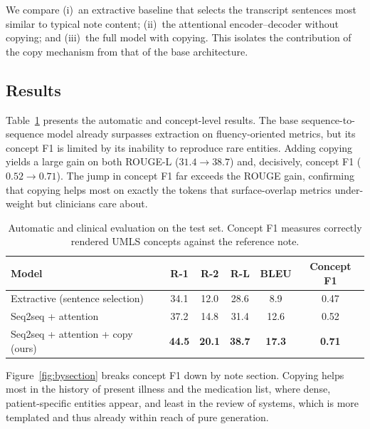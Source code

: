 \documentclass{article}
\begin{document}
We compare (i)~an extractive baseline that selects the transcript sentences most
similar to typical note content; (ii)~the attentional encoder--decoder without
copying; and (iii)~the full model with copying. This isolates the contribution of
the copy mechanism from that of the base architecture.

\subsection{Results}

Table~\ref{tab:main} presents the automatic and concept-level results. The base
sequence-to-sequence model already surpasses extraction on fluency-oriented metrics,
but its concept F1 is limited by its inability to reproduce rare entities. Adding
copying yields a large gain on both ROUGE-L ($31.4 \rightarrow 38.7$) and, decisively,
concept F1 ($0.52 \rightarrow 0.71$). The jump in concept F1 far exceeds the ROUGE
gain, confirming that copying helps most on exactly the tokens that surface-overlap
metrics under-weight but clinicians care about.

\begin{table}[t]
\caption{Automatic and clinical evaluation on the test set. Concept F1 measures
correctly rendered UMLS concepts against the reference note.}
\label{tab:main}
\centering
\small
\begin{tabular}{lccccc}
\toprule
Model & R-1 & R-2 & R-L & BLEU & Concept F1 \\
\midrule
Extractive (sentence selection)          & 34.1 & 12.0 & 28.6 & 8.9  & 0.47 \\
Seq2seq + attention                      & 37.2 & 14.8 & 31.4 & 12.6 & 0.52 \\
Seq2seq + attention + copy (ours)        & \textbf{44.5} & \textbf{20.1} & \textbf{38.7} & \textbf{17.3} & \textbf{0.71} \\
\bottomrule
\end{tabular}
\end{table}

Figure~\ref{fig:bysection} breaks concept F1 down by note section. Copying helps
most in the history of present illness and the medication list, where dense,
patient-specific entities appear, and least in the review of systems, which is more
templated and thus already within reach of pure generation.
\end{document}
